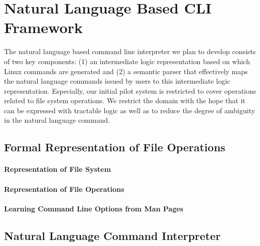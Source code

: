 \section{Natural Language Based CLI Framework}

The natural language based command line interpreter we plan to develop consists of two key components: (1) an intermediate logic representation based on which Linux commands are generated and (2) a semantic parser that effectively maps the natural language commands issued by users to this intermediate logic representation. Especially, our initial pilot system is restricted to cover operations related to file system operations. We restrict the domain with the hope that it can be expressed with tractable logic as well as to reduce the degree of ambiguity in the natural language command.

\subsection{Formal Representation of File Operations}
\paragraph{Representation of File System}
\paragraph{Representation of File Operations}
\paragraph{Learning Command Line Options from Man Pages}

\subsection{Natural Language Command Interpreter}